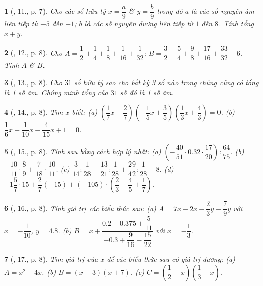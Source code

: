 \documentclass{article}
\newtheorem{baitoan}{}
\begin{document}
\begin{baitoan}[\cite{Tuyen_Toan_7}, 11., p. 7]
	Cho các số hữu tỷ $x = \dfrac{a}{9}$ \& $y = \dfrac{b}{9}$ trong đó $a$ là các số nguyên âm liên tiếp từ $-5$ đến $-1$; $b$ là các số nguyên dương liên tiếp từ $1$ đến $8$. Tính tổng $x + y$.
\end{baitoan}

\begin{baitoan}[\cite{Tuyen_Toan_7}, 12., p. 8]
	Cho $A = \dfrac{1}{2} + \dfrac{1}{4} + \dfrac{1}{8} + \dfrac{1}{16} + \dfrac{1}{32}$; $B = \dfrac{3}{2} + \dfrac{5}{4} + \dfrac{9}{8} + \dfrac{17}{16} + \dfrac{33}{32} - 6$. Tính $A$ \& $B$.
\end{baitoan}

\begin{baitoan}[\cite{Tuyen_Toan_7}, 13., p. 8]
	Cho $31$ số hữu tỷ sao cho bất kỳ 3 số nào trong chúng cũng có tổng là 1 số âm. Chứng minh tổng của $31$ số đó là 1 số âm.
\end{baitoan}

\begin{baitoan}[\cite{Tuyen_Toan_7}, 14., p. 8]
	Tìm $x$ biết: (a) $\left(\dfrac{1}{7}x - \dfrac{2}{7}\right)\left(-\dfrac{1}{5}x + \dfrac{3}{5}\right)\left(\dfrac{1}{3}x + \dfrac{4}{3}\right) = 0$. (b) $\dfrac{1}{6}x + \dfrac{1}{10}x - \dfrac{4}{15}x + 1 = 0$.
\end{baitoan}

\begin{baitoan}[\cite{Tuyen_Toan_7}, 15., p. 8]
	Tính sau bằng cách hợp lý nhất: (a) $\left(-\dfrac{40}{51}\cdot 0.32\cdot\dfrac{17}{20}\right):\dfrac{64}{75}$. (b) $-\dfrac{10}{11}\cdot\dfrac{8}{9} + \dfrac{7}{18}\cdot\dfrac{10}{11}$. (c) $\dfrac{3}{14}:\dfrac{1}{28} - \dfrac{13}{21}:\dfrac{1}{28} + \dfrac{29}{42}:\dfrac{1}{28} - 8$. (d) $-1\dfrac{5}{7}\cdot 15 + \dfrac{2}{7}(-15) + (-105)\cdot\left(\dfrac{2}{3} - \dfrac{4}{5} + \dfrac{1}{7}\right)$.
\end{baitoan}

\begin{baitoan}[\cite{Tuyen_Toan_7}, 16., p. 8]
	Tính giá trị các biểu thức sau: (a) $A = 7x - 2x - \dfrac{2}{3}y + \dfrac{7}{9}y$ với $x = -\dfrac{1}{10}$, $y = 4.8$. (b) $B = x + \dfrac{0.2 - 0.375 + \dfrac{5}{11}}{-0.3 + \dfrac{9}{16} - \dfrac{15}{22}}$ với $x = -\dfrac{1}{3}$.
\end{baitoan}

\begin{baitoan}[\cite{Tuyen_Toan_7}, 17., p. 8]
	Tìm giá trị của $x$ để các biểu thức sau có giá trị dương: (a) $A = x^2 + 4x$. (b) $B = (x - 3)(x + 7)$. (c) $C = \left(\dfrac{1}{2} - x\right)\left(\dfrac{1}{3} - x\right)$.
\end{baitoan}
\end{document}
